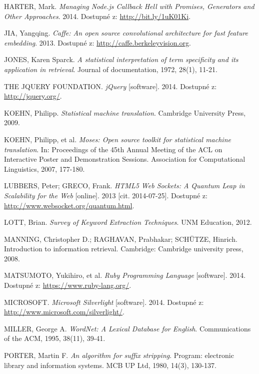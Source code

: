 \begin{thebibliography}{99}
  HARTER, Mark. \textit{Managing Node.js Callback Hell with Promises, Generators and Other Approaches}. 2014.
  Dostupné z: \url{http://bit.ly/1uK01Ki}.

  JIA, Yangqing. \textit{Caffe: An open source convolutional architecture for fast feature embedding}. 2013.
  Dostupné z: \url{http://caffe.berkeleyvision.org}.

  JONES, Karen Sparck. \textit{A statistical interpretation of term specificity and its application in retrieval}. Journal of documentation, 1972, 28(1), 11-21.

  THE JQUERY FOUNDATION. \textit{jQuery} [software]. 2014.
  Dostupné z: \url{http://jquery.org/}.

  KOEHN, Philipp. \textit{Statistical machine translation}. Cambridge University Press, 2009.

  KOEHN, Philipp, et al. \textit{Moses: Open source toolkit for statistical machine translation}. In: Proceedings of the 45th Annual Meeting of the ACL on Interactive Poster and Demonstration Sessions. Association for Computational Linguistics, 2007, 177-180.

  LUBBERS, Peter; GRECO, Frank. \textit{HTML5 Web Sockets: A Quantum Leap in Scalability for the Web} [online].
  2013 [cit. 2014-07-25].
  Dostupné z: \url{http://www.websocket.org/quantum.html}.

  LOTT, Brian. \textit{Survey of Keyword Extraction Techniques}. UNM Education, 2012.

  MANNING, Christopher D.; RAGHAVAN, Prabhakar; SCHÜTZE, Hinrich. Introduction to information retrieval. Cambridge: Cambridge university press, 2008.

  MATSUMOTO, Yukihiro, et al. \textit{Ruby Programming Language} [software]. 2014.
  Dostupné z: \url{https://www.ruby-lang.org/}.

  MICROSOFT. \textit{Microsoft Silverlight} [software]. 2014.
  Dostupné z: \url{http://www.microsoft.com/silverlight/}.


  MILLER, George A.
  \emph{WordNet: A Lexical Database for English}.
  Communications of the ACM, 1995, 38(11), 39-41.

  PORTER, Martin F.
  \emph{An algorithm for suffix stripping}.
  Program: electronic library and information systems. MCB UP Ltd, 1980, 14(3), 130-137.


\end{thebibliography}
